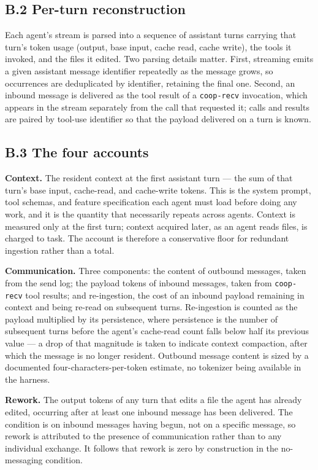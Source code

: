 \documentclass[11pt,a4paper]{article}
\begin{document}
\subsection*{B.2 \quad Per-turn reconstruction}

Each agent's stream is parsed into a sequence of assistant turns carrying that
turn's token usage (output, base input, cache read, cache write), the tools it
invoked, and the files it edited. Two parsing details matter. First, streaming
emits a given assistant message identifier repeatedly as the message grows, so
occurrences are deduplicated by identifier, retaining the final one. Second, an
inbound message is delivered as the tool result of a \texttt{coop-recv}
invocation, which appears in the stream separately from the call that requested
it; calls and results are paired by tool-use identifier so that the payload
delivered on a turn is known.

\subsection*{B.3 \quad The four accounts}

\textbf{Context.} The resident context at the first assistant turn --- the sum of
that turn's base input, cache-read, and cache-write tokens. This is the system
prompt, tool schemas, and feature specification each agent must load before doing
any work, and it is the quantity that necessarily repeats across agents. Context
is measured only at the first turn; context acquired later, as an agent reads
files, is charged to task. The account is therefore a conservative floor for
redundant ingestion rather than a total.

\textbf{Communication.} Three components: the content of outbound messages, taken
from the send log; the payload tokens of inbound messages, taken from
\texttt{coop-recv} tool results; and re-ingestion, the cost of an inbound payload
remaining in context and being re-read on subsequent turns. Re-ingestion is
counted as the payload multiplied by its persistence, where persistence is the
number of subsequent turns before the agent's cache-read count falls below half
its previous value --- a drop of that magnitude is taken to indicate context
compaction, after which the message is no longer resident. Outbound message
content is sized by a documented four-characters-per-token estimate, no tokenizer
being available in the harness.

\textbf{Rework.} The output tokens of any turn that edits a file the agent has
already edited, occurring after at least one inbound message has been delivered.
The condition is on inbound messages having begun, not on a specific message, so
rework is attributed to the presence of communication rather than to any
individual exchange. It follows that rework is zero by construction in the
no-messaging condition.
\end{document}
